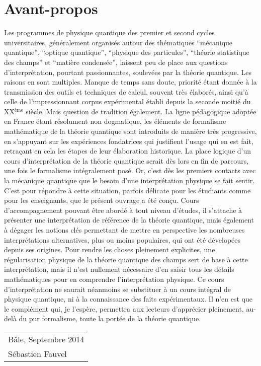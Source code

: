 \cleardoublepage

\section*{Avant-propos}

Les programmes de physique quantique des premier et second cycles universitaires,
généralement organisés autour des thématiques ``mécanique quantique'', ``optique quantique'',
``physique des particules'', ``théorie statistique des champs'' et ``matière condensée'',
laissent peu de place aux questions d'interprétation, pourtant passionnantes, soulevées par la théorie quantique.
Les raisons en sont multiples.
Manque de temps sans doute,
priorité étant donnée à la transmission des outils et techniques de calcul, souvent très élaborés,
ainsi qu'à celle de l'impressionnant corpus expérimental établi depuis la seconde moitié du XX$^\mathrm{ème}$ siècle.
Mais question de tradition également.
La ligne pédagogique adoptée en France étant résolument non dogmatique,
les éléments de formalisme mathématique de la théorie quantique sont introduits de manière très progressive,
en s'appuyant sur les expériences fondatrices qui justifient l'usage qui en est fait,
retraçant en cela les étapes de leur élaboration historique.
La place logique d'un cours d'interprétation de la théorie quantique serait dès lors en fin de parcours,
une fois le formalisme intégralement posé.
Or, c'est dès les premiers contacts avec la mécanique quantique que le besoin d'une interprétation physique se fait sentir.
C'est pour répondre à cette situation, parfois délicate pour les étudiants comme pour les enseignants,
que le présent ouvrage a été conçu.
Cours d'accompagnement pouvant être abordé à tout niveau d'études,
il s'attache à présenter une interprétation de référence de la théorie quantique,
mais également à dégager les notions clés permettant de mettre en perspective les nombreuses interprétations alternatives,
plus ou moins populaires, qui ont été dévelopées depuis ses origines.
Pour rendre les choses pleinement explicites,
une régularisation physique de la théorie quantique des champs sert de base à cette interprétation,
mais il n'est nullement nécessaire d'en saisir tous les détails mathématiques pour en comprendre l'interprétation physique.
Ce cours d'interprétation ne saurait néanmoins se substituer à un cours intégral de physique quantique,
ni à la connaissance des faits expérimentaux.
Il n'en est que le complément qui, je l'espère, permettra aux lecteurs d'apprécier pleinement,
au-delà du pur formalisme, toute la portée de la théorie quantique.

\begin{flushright}
\begin{tabular}{l}
Bâle, Septembre 2014\\
Sébastien Fauvel
\end{tabular}
\end{flushright}
